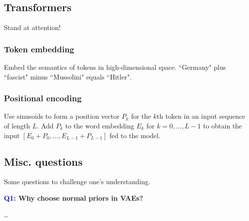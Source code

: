 \documentclass[11pt]{article}
\begin{document}
\subsection{Transformers}
Stand at attention!

\subsubsection{Token embedding}
Embed the semantics of tokens in high-dimensional space. ``Germany" plus ``fascist" minus ``Mussolini" equals ``Hitler".

\subsubsection{Positional encoding}
Use sinusoids to form a position vector $P_k$ for the $k$th token in an input sequence of length $L$. Add $P_k$ to the word embedding $E_k$ for $k=0,\dots,L-1$ to obtain the input $[E_0+P_0,\dots,E_{L-1}+P_{L-1}]$ fed to the model.

\subsection{Misc. questions}

Some questions to challenge one's understanding.

\begin{center}
    \textbf{\textcolor{blue}{Q1:} Why choose normal priors in VAEs?}
\end{center}
\dots
\end{document}
